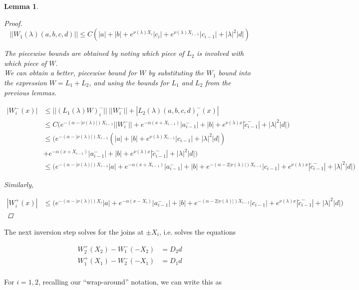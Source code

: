 \documentclass[12pt]{article}
\newtheorem{lemma}{Lemma}
\begin{document}
\begin{lemma}
\begin{proof}
\[
||W_1(\lambda)(a,b,c,d)|| \leq C (|a| + |b| + e^{\nu(\lambda)X_i}|c_i| + e^{\nu(\lambda)X_{i-1}}|c_{i-1}| + |\lambda|^2 |d| )
\]

The piecewise bounds are obtained by noting which piece of $L_2$ is involved with which piece of $W$.\\

We can obtain a better, piecewise bound for $W$ by substituting the $W_1$ bound into the expression $W = L_1 + L_2$, and using the bounds for $L_1$ and $L_2$ from the previous lemmas.

\begin{align*}
|W_i^-(x)| &\leq ||(L_1(\lambda)W)_i^-||\:||W_i^-|| + |L_2(\lambda)(a,b,c,d)_i^-(x)| \\
&\leq C \Big( e^{-(\alpha -|\nu(\lambda)|)X_{i-1}} ||W_i^-|| + e^{-\alpha(x + X_{i-1})}|a_{i-1}^-| + |b| + e^{\nu(\lambda)x} |\tilde{c}_{i-1}^-| + |\lambda|^2 |d| \Big) \\
&\leq \Big( e^{-(\alpha -|\nu(\lambda)|)X_{i-1}} (|a| + |b| + e^{\nu(\lambda)X_{i-1}}|c_{i-1}| + |\lambda|^2 |d|) \\
&+ e^{-\alpha(x + X_{i-1})}|a_{i-1}^-| + |b| + e^{\nu(\lambda)x} |\tilde{c}_{i-1}^-| + |\lambda|^2 |d| \Big) \\
&\leq \Big( e^{-(\alpha -|\nu(\lambda)|)X_{i-1}} |a| + e^{-\alpha(x + X_{i-1})}|a_{i-1}^-| + |b| + e^{-(\alpha - 2|\nu(\lambda)|)X_{i-1}} |c_{i-1}| + e^{\nu(\lambda)x} |\tilde{c}_{i-1}^-| + |\lambda|^2 |d| \Big)
\end{align*}

Similarly, 

\begin{align*}
|W_i^+(x)| &\leq \Big( e^{-(\alpha -|\nu(\lambda)|)X_i} |a| + e^{-\alpha(x - X_i)}|a_{i-1}^-| + |b| + e^{-(\alpha - 2|\nu(\lambda)|)X_{i-1}} |c_{i-1}| + e^{\nu(\lambda)x} |\tilde{c}_{i-1}^-| + |\lambda|^2 |d| \Big)
\end{align*}

\end{proof}
\end{lemma}

The next inversion step solves for the joins at $\pm X_i$, i.e. solves the equations

\begin{align*}
W_2^+(X_2) - W_1^-(-X_2) &= D_2 d \\
W_1^+(X_1) - W_2^-(-X_1) &= D_1 d \\
\end{align*}

For $i = 1, 2$, recalling our ``wrap-around'' notation, we can write this as
\end{document}
